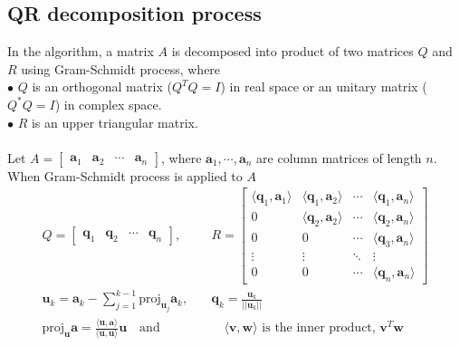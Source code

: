 \documentclass[12pt,a4paper]{article}
\begin{document}
\subsection{QR decomposition process}
In the algorithm, a matrix $A$ is decomposed into product of two matrices $Q$ and $R$ using Gram-Schmidt process, where \\
$\bullet$ $Q$ is an orthogonal matrix ($Q^{T}Q = I$) in real space or an unitary matrix ($Q^{*}Q =I$) in complex space. \\
$\bullet$ $R$ is an upper triangular matrix. \\\\
Let $A = [\begin{matrix}
    \mathbf{a}_1 & \mathbf{a}_2 & \cdots & \mathbf{a}_n
\end{matrix}]$, where $\mathbf{a}_1, \cdots, \mathbf{a}_n$ are column matrices of length $n$. When Gram-Schmidt process is applied to $A$
\begin{align*}
    Q = \begin{bmatrix}
        \mathbf{q}_1 & \mathbf{q}_2 & \cdots & \mathbf{q}_n
    \end{bmatrix},\quad & R = \begin{bmatrix}
        \langle \mathbf{q}_1,\mathbf{a}_1 \rangle & \langle \mathbf{q}_1,\mathbf{a}_2 \rangle & \cdots & \langle \mathbf{q}_1,\mathbf{a}_n \rangle \\
        0 & \langle \mathbf{q}_2, \mathbf{a}_2 \rangle & \cdots & \langle \mathbf{q}_2, \mathbf{a}_n \rangle \\
0 & 0 & \cdots & \langle \mathbf{q}_3, \mathbf{a}_n \rangle \\
\vdots & \vdots & \ddots & \vdots \\
0 & 0 & \cdots & \langle \mathbf{q}_n, \mathbf{a}_n \rangle
    \end{bmatrix} \\
    \mathbf{u}_k = \mathbf{a}_k - \sum\limits_{j=1}^{k-1}\text{proj}_{\mathbf{u}_j}\mathbf{a}_k,\quad & \mathbf{q}_k = \frac{\mathbf{u}_k}{||\mathbf{u}_k||} \\
    \text{proj}_\mathbf{u}\mathbf{a} = \frac{\langle \mathbf{u},\mathbf{a}\rangle}{\langle \mathbf{u},\mathbf{u}\rangle}\mathbf{u} \quad \text{and} & \quad \langle \mathbf{v},\mathbf{w}\rangle \text{ is the inner product, } \mathbf{v}^T\mathbf{w}
\end{align*}
\end{document}
